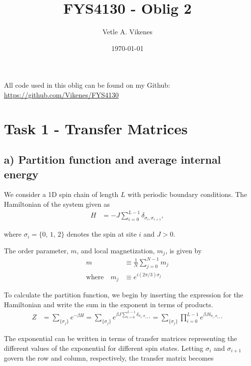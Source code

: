 \documentclass[reprint,english,notitlepage,aps,nobalancelastpage,nofootinbib]{revtex4-1}
\newcommand{\sumstate}{\sum_{\{\sigma_j\}}}
\begin{document}
\begin{center}
\title{\Huge FYS4130 - Oblig 2}
\author{\large Vetle A. Vikenes}
\date{\today}
\noaffiliation


\maketitle
\end{center}
\onecolumngrid

All code used in this oblig can be found on my Github: \url{https://github.com/Vikenes/FYS4130}
\\
\section*{\large Task 1 - Transfer Matrices}

\subsection*{a) Partition function and average internal energy}

We consider a 1D spin chain of length $L$ with periodic boundary conditions. The Hamiltonian of the system given as  
\begin{align} \label{eq:Hamiltonian}
	H &= -J \sum_{i=0}^{L-1} \delta_{\sigma_i,\sigma_{i+1}},
\end{align}

where $\sigma_i=\{0,\,1,\,2\}$ denotes the spin at site $i$ and $J>0$.    

The order parameter, $m$, and local magnetization, $m_j$, is given by
\begin{align}
	m &\equiv \frac{1}{N} \sum_{j=0}^{N-1} m_j \label{eq:order parameter}  \\ 
	\text{where}\quad m_j &\equiv e^{i(2\pi/3)\sigma_j} \label{eq:magnetization}
\end{align}

To calculate the partition function, we begin by inserting the expression for the Hamiltonian and write the sum in the exponent in terms of products. 
\begin{align*}
	Z &= \sum_{\{\sigma_j\}} e^{-\beta H} = \sumstate e^{\beta J \sum_{i=0}^{L-1} \delta_{\sigma_i,\sigma_{i+1}}} = \sumstate \prod_{i=0}^{L-1} e^{\beta J \delta_{\sigma_i,\sigma_{i+1}}}
\end{align*}

The exponential can be written in terms of transfer matrices representing the different values of the exponential for different spin states. Letting $\sigma_i$ and $\sigma_{i+1}$ govern the row and column, respectively, the transfer matrix becomes 
\end{document}
